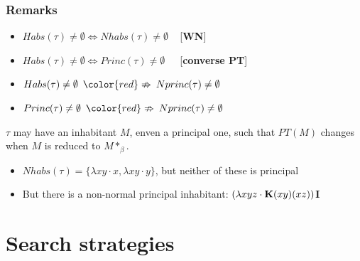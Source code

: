\begin{frame}
\frametitle{Remarks}
 \begin{itemize}
  \item $Habs(\tau) \neq \emptyset \Longleftrightarrow Nhabs(\tau) \neq \emptyset\,\,\,\,\,$ [\textbf{WN}]
  \item $Habs(\tau) \neq \emptyset \Longleftrightarrow Princ(\tau) \neq \emptyset\,\,\,\,\,\,\,$ [\textbf{converse PT}]
  \item $Habs(\tau) \neq \emptyset \,\,\,{\color{red}\nRightarrow} \,\,\,Nprinc(\tau) \neq \emptyset$
  \item $Princ(\tau) \neq \emptyset \,\,\,{\color{red}\nRightarrow} \,\,\, Nprinc(\tau) \neq \emptyset$
 \end{itemize}

\begin{block}{} 
$\tau$ may have an inhabitant $M$, enven a principal one, such that $PT(M)$ changes when $M$ is reduced to $M*_{\beta}$. 
\end{block}

\begin{exa}
\begin{itemize}
 \item $Nhabs(\tau) = \{\lambda xy \cdot x, \lambda xy \cdot y\}$, but neither of these is principal
 \item But there is a non-normal principal inhabitant: $(\lambda xyz \cdot \mbox{\textbf{K}}(xy)(xz))$\textbf{I}
\end{itemize}


\end{exa}
 
 
\end{frame}




\section{Search strategies}

